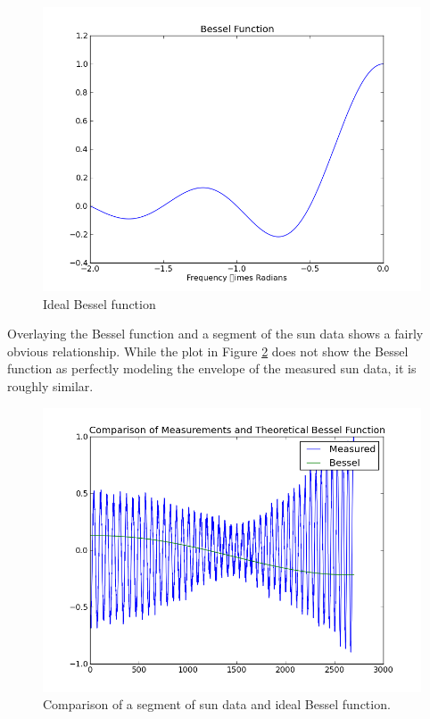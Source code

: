 \documentclass{article}
\begin{document}
    \begin{figure}[h!]
    \centering
    \includegraphics[scale=0.5]{img/sun/bessel.png}
    \caption{Ideal Bessel function}
    \label{fig:bessel_sun}
    \end{figure}

    Overlaying the Bessel function and a segment of the sun data shows a fairly
    obvious relationship. While the plot in Figure \ref{fig:compare_bessel} does
    not show the Bessel function as perfectly modeling the envelope of the
    measured sun data, it is roughly similar.

    \begin{figure}[h!]
    \centering
    \includegraphics[scale=0.5]{img/sun/compare_bessel.png}
    \caption{Comparison of a segment of sun data and ideal Bessel function.}
    \label{fig:compare_bessel}
    \end{figure}
\end{document}
